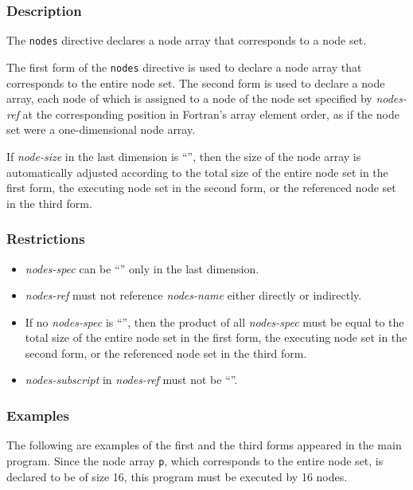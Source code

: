 \subsubsection*{Description}

The {\tt nodes} directive declares a node array that corresponds to a
node set.

The first form of the {\tt nodes} directive is used to declare a node
array that corresponds to the entire node set.
The second form is used to declare a node array, each node of which is
assigned to a node of the node set specified by {\it nodes-ref} at the
corresponding position in Fortran's array element order, as if the node
set were a one-dimensional node array.

If {\it node-size} in the last dimension is ``{\tt *}'', then the size
of the node array is automatically adjusted according to the total size
of the entire node set in the first form, the executing node set in the
second form, or the referenced node set in the third form.

\subsubsection*{Restrictions}

\begin{itemize}
\item {\it nodes-spec} can be ``{\tt *}'' only in the last dimension.
\item {\it nodes-ref} must not reference {\it nodes-name} either
      directly or indirectly.
\item If no {\it nodes-spec} is ``{\tt *}'', then the product
      of all {\it nodes-spec} must be equal to the total size of the
      entire node set in the first form, the executing node set in the
      second form, or the referenced node set in the third form.
\item {\it nodes-subscript} in {\it nodes-ref} must not be ``{\tt *}''.
\end{itemize}

\subsubsection*{Examples}

The following are examples of the first and the third forms appeared in
the main program. Since the node array {\tt p}, which corresponds to the
entire node set, is declared to be of size 16, this program must be
executed by 16 nodes.


